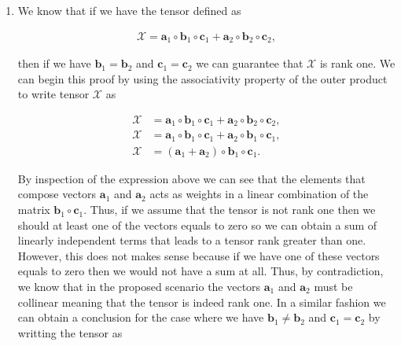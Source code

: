 \documentclass[a4paper,10pt]{article}
\begin{document}

\thispagestyle{empty}

\newpage

\thispagestyle{empty}

\begin{enumerate}
\renewcommand{\labelenumi}{{\Large\bfseries\arabic{enumi}.}}
   
    \item We know that if we have the tensor defined as
    
        \begin{align}
            \mathcal{X} = \boldsymbol{a}_{1} \circ \boldsymbol{b}_{1} \circ \boldsymbol{c}_{1} + \boldsymbol{a}_{2} \circ \boldsymbol{b}_{2} \circ \boldsymbol{c}_{2},
        \end{align}

        then if we have $\boldsymbol{b}_{1} = \boldsymbol{b}_{2}$ and $\boldsymbol{c}_{1} = \boldsymbol{c}_{2}$ we can guarantee that $\mathcal{X}$ is rank one. We can begin this proof by using the associativity property of the outer product to write tensor $\mathcal{X}$ as

        \begin{align}
            \mathcal{X} &= \boldsymbol{a}_{1} \circ \boldsymbol{b}_{1} \circ \boldsymbol{c}_{1} + \boldsymbol{a}_{2} \circ \boldsymbol{b}_{2} \circ \boldsymbol{c}_{2}, \\
            \mathcal{X} &= \boldsymbol{a}_{1} \circ \boldsymbol{b}_{1} \circ \boldsymbol{c}_{1} + \boldsymbol{a}_{2} \circ \boldsymbol{b}_{1} \circ \boldsymbol{c}_{1}, \\
            \mathcal{X} &= (\boldsymbol{a}_{1} + \boldsymbol{a}_{2}) \circ \boldsymbol{b}_{1} \circ \boldsymbol{c}_{1}.
        \end{align}
        
        By inspection of the expression above we can see that the elements that compose vectors $\boldsymbol{a}_{1}$ and $\boldsymbol{a}_{2}$
        acts as weights in a linear combination of the matrix $\boldsymbol{b}_{1} \circ \boldsymbol{c}_{1}$. Thus, if we assume that the tensor is not rank one then we should at least one of the vectors equals to zero so we can obtain a sum of linearly independent terms that leads to a tensor rank greater than one. 
        However, this does not makes sense because if we have one of these vectors equals to zero then  we would not have a sum at all. Thus, by contradiction, we know that in the proposed scenario the vectors $\boldsymbol{a}_{1}$ and $\boldsymbol{a}_{2}$ must be collinear meaning that the tensor is indeed rank one.
        In a similar fashion we can obtain a conclusion for the case
        where we have $\boldsymbol{b}_{1} \neq \boldsymbol{b}_{2}$ and $\boldsymbol{c}_{1} = \boldsymbol{c}_{2}$ by writting the tensor as


\end{enumerate}
\end{document}
